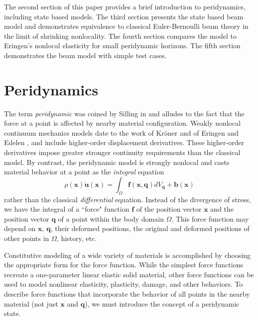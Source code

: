 \documentclass[11pt]{amsart}
\newcommand{\mathbi}[1]{\mathit{\mathbf{#1}}}
\begin{document}
The second section of this paper provides a brief introduction to peridynamics, including state based models.
The third section presents the state based beam model and demonstrates equivalence to classical Euler-Bernoulli beam theory in the limit of shrinking nonlocality.
The fourth section compares the model to Eringen's nonlocal elasticity for small peridynamic horizons.
The fifth section demonstrates the beam model with simple test cases.
%
\section{Peridynamics}
\label{sec:PDintro}
The term \textit{peridynamic} was coined by Silling in \cite{silling2000reformulation} and alludes to the fact that the force at a point is affected by nearby material configuration.
Weakly nonlocal continuum mechanics models date to the work of Kr\"oner \cite{kroner1967elasticity} and of Eringen and Edelen \cite{eringen1972nonlocal}, and include higher-order displacement derivatives.
These higher-order derivatives impose greater stronger continuity requirements than the classical model. 
By contrast, the peridynamic model is strongly nonlocal and casts material behavior at a point as the \textit{integral} equation 
%
\begin{equation}
\label{eq:PDCoPV}
\rho(\mathbf{x})\ddot{\mathbf{u}}(\mathbf{x}) = \int_\Omega \mathbi{f}(\mathbf{x},\mathbf{q}) dV_\mathbf{q}  + \mathbf{b}(\mathbf{x})
\end{equation}
%
rather than the classical \textit{differential} equation.
Instead of the divergence of stress, we have the integral of a ``force" function $\mathbi{f}$ of the position vector $\mathbf{x}$ and the position vector $\mathbf{q}$ of a point within the body domain $\Omega$. 
This force function may depend on \(\mathbf{x}\), \(\mathbf{q}\), their deformed positions, the original and deformed positions of other points in \(\Omega\), history, etc.

Constitutive modeling of a wide variety of materials is accomplished by choosing the appropriate form for the force function.
While the simplest force functions recreate a one-parameter linear elastic solid material\cite{silling2000reformulation}, other force functions can be used to model nonlinear elasticity, plasticity, damage, and other behaviors\cite{silling2005peridynamic}.
To describe force functions that incorporate the behavior of all points in the nearby material (not just \(\mathbf{x}\) and \(\mathbf{q}\)), we must introduce the concept of a peridynamic state.
\end{document}
